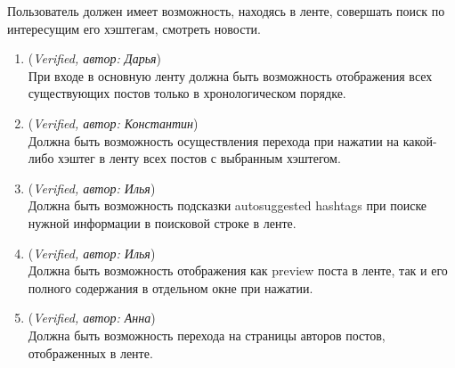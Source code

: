 \begin{enumerate}
	Пользователь должен имеет возможность, находясь в ленте, совершать поиск по интересущим его хэштегам, смотреть новости.
	\begin{enumerate}
		\item (\textit{Verified, автор: Дарья})\\
		При входе в основную ленту должна быть возможность отображения всех существующих постов только в хронологическом порядке.
		\item (\textit{Verified, автор: Константин}) \\ 
		Должна быть возможность осуществления перехода при нажатии на какой-либо хэштег в ленту всех постов с выбранным хэштегом. 
		\item (\textit{Verified, автор: Илья})\\
		Должна быть возможность подсказки autosuggested hashtags при поиске нужной информации в поисковой строке в ленте. 
		\item (\textit{Verified, автор: Илья})\\
		Должна быть возможность отображения как preview поста в ленте, так и его полного содержания в отдельном окне при нажатии. 
		\item (\textit{Verified, автор: Анна})\\
		Должна быть возможность перехода на страницы авторов постов, отображенных в ленте. 
		

\end{enumerate}
\end{enumerate}
